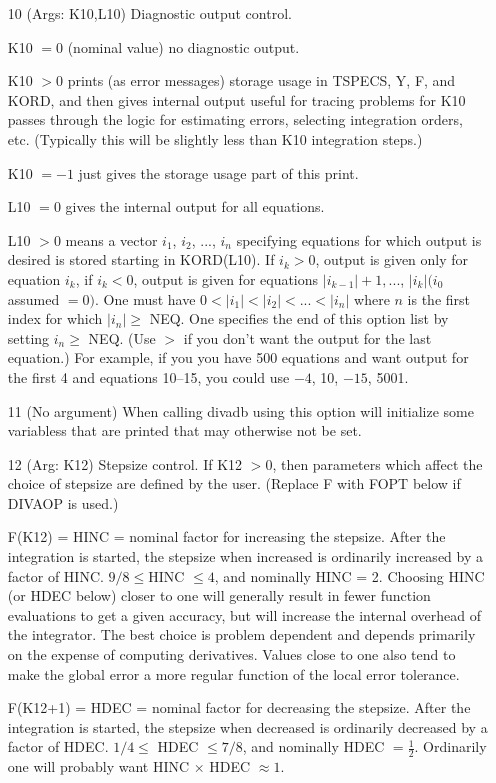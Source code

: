 \documentclass[twoside]{MATH77}
\begin{document}
\begin{itemize}
\item[10]  (Args: K10,L10) Diagnostic output control.

K10 $=0$ (nominal value) no diagnostic output.

K10 $>0$ prints (as error messages) storage usage in TSPECS, Y, F, and KORD,
and then gives internal output useful for tracing problems for K10 passes
through the logic for estimating errors, selecting integration orders, etc.
(Typically this will be slightly less than K10 integration steps.)

K10 $=-1$ just gives the storage usage part of this print.

L10 $=0$ gives the internal output for all equations.

L10 $>0$ means a vector $i_1$, $i_2$, ..., $i_n$ specifying equations for which
output is desired is stored starting in KORD(L10). If $i_k>0$, output is
given only for equation $i_k$, if $i_k<0$, output is given for equations $%
|i_{k-1}|+1,...$, $|i_k|(i_0$ assumed $=0)$. One must have $%
0<|i_1|<|i_2|<...<|i_n|$ where $n$ is the first index for which $|i_n|\geq $
NEQ.  One  specifies the end of this option list by setting $i_n \geq$
NEQ. (Use $>$ if you don't want the output for the last equation.)  For
example, if you you have 500 equations and want output for the first 4 and
equations 10--15, you could use $-4$, 10, $-15$, 5001.

\item[11]  (No argument) When calling divadb using this option will
  initialize some variabless that are printed that may otherwise not
  be set.

\item[12]  (Arg: K12) Stepsize control. If K12 $>0$, then parameters which
affect the choice of stepsize are defined by the user.  (Replace F
with FOPT below if DIVAOP is used.)

F(K12) = HINC = nominal factor for increasing the stepsize. After the
integration is started, the stepsize when increased is ordinarily increased
by a factor of HINC. $9/8\leq $HINC $\leq 4$, and nominally HINC = 2.
Choosing HINC (or HDEC below) closer to one will generally result in fewer
function evaluations to get a given accuracy, but will increase the internal
overhead of the integrator. The best choice is problem dependent and depends
primarily on the expense of computing derivatives. Values close to one also
tend to make the global error a more regular function of the local error
tolerance.

F(K12+1) = HDEC = nominal factor for decreasing the stepsize. After the
integration is started, the stepsize when decreased is ordinarily decreased
by a factor of HDEC. $1/4\leq $ HDEC $\leq 7/8$, and nominally HDEC $%
=\frac 12$. Ordinarily one will probably want HINC $\times $ HDEC $\approx
1.$


\end{itemize}
\end{document}
